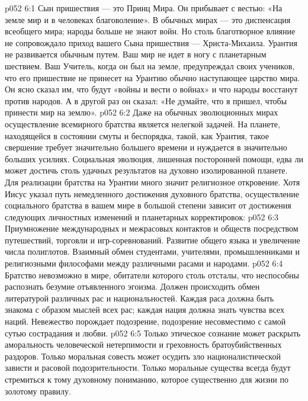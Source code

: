 \vs p052 6:1 Сын пришествия --- это Принц Мира. Он прибывает с вестью: «На земле мир и в человеках благоволение». В обычных мирах --- это диспенсация всеобщего мира; народы больше не знают войн. Но столь благотворное влияние не сопровождало приход вашего Сына пришествия --- Христа\hyp{}Михаила. Урантия не развивается обычным путем. Ваш мир не идет в ногу с планетарным шествием. Ваш Учитель, когда он был на земле, предупреждал своих учеников, что его пришествие не принесет на Урантию обычно наступающее царство мира. Он ясно сказал им, что будут «войны и вести о войнах» и что народы восстанут против народов. А в другой раз он сказал: «Не думайте, что я пришел, чтобы принести мир на землю».
\vs p052 6:2 Даже на обычных эволюционных мирах осуществление всемирного братства является нелегкой задачей. На планете, находящейся в состоянии смуты и беспорядка, такой, как Урантия, такое свершение требует значительно большего времени и нуждается в значительно больших усилиях. Социальная эволюция, лишенная посторонней помощи, едва ли может достичь столь удачных результатов на духовно изолированной планете. Для реализации братства на Урантии много значит религиозное откровение. Хотя Иисус указал путь немедленного достижения духовного братства, осуществление социального братства в вашем мире в большой степени зависит от достижения следующих личностных изменений и планетарных корректировок:
\vs p052 6:3 \bibnobreakspace {} Приумножение международных и межрасовых контактов и обществ посредством путешествий, торговли и игр\hyp{}соревнований. Развитие общего языка и увеличение числа полиглотов. Взаимный обмен студентами, учителями, промышленниками и религиозными философами между различными расами и народами.
\vs p052 6:4 \pc {}\bibnobreakspace {} Братство невозможно в мире, обитатели которого столь отсталы, что неспособны распознать безумие отъявленного эгоизма. Должен происходить обмен литературой различных рас и национальностей. Каждая раса должна быть знакома с образом мыслей всех рас; каждая нация должна знать чувства всех наций. Невежество порождает подозрение, подозрение несовместимо с самой сутью сострадания и любви.
\vs p052 6:5 \pc {}\bibnobreakspace {} Только этическое сознание может раскрыть аморальность человеческой нетерпимости и греховность братоубийственных раздоров. Только моральная совесть может осудить зло националистической зависти и расовой подозрительности. Только моральные существа всегда будут стремиться к тому духовному пониманию, которое существенно для жизни по золотому правилу.
